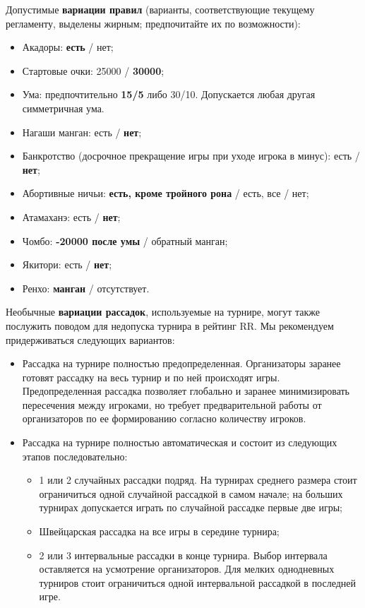 Допустимые \textbf{вариации правил} (варианты, соответствующие текущему регламенту, выделены жирным; предпочитайте их по возможности):
\begin{itemize}
	\item Акадоры: \textbf{есть} / нет;
	\item Стартовые очки: 25000 / \textbf{30000};
	\item Ума: предпочтительно \textbf{15/5} либо 30/10. Допускается любая другая симметричная ума.
	\item Нагаши манган: есть / \textbf{нет};
	\item Банкротство (досрочное прекращение игры при уходе игрока в минус): есть / \textbf{нет};
	\item Абортивные ничьи: \textbf{есть, кроме тройного рона} / есть, все / нет;
	\item Атамаханэ: есть / \textbf{нет};
	\item Чомбо: \textbf{-20000 после умы} / обратный манган;
	\item Якитори: есть / \textbf{нет};
	\item Ренхо: \textbf{манган} / отсутствует.
\end{itemize}

Необычные \textbf{вариации рассадок}, используемые на турнире, могут также послужить поводом для недопуска турнира в рейтинг RR. Мы рекомендуем придерживаться следующих вариантов:
\begin{itemize}
	\item Рассадка на турнире полностью предопределенная. Организаторы заранее готовят рассадку на весь турнир и по ней происходят игры. Предопределенная рассадка позволяет глобально и заранее минимизировать пересечения между игроками, но требует предварительной работы от организаторов по ее формированию согласно количеству игроков.
	\item Рассадка на турнире полностью автоматическая и состоит из следующих этапов последовательно:
	\begin{itemize}
		\item 1 или 2 случайных рассадки подряд. На турнирах среднего размера стоит ограничиться одной случайной рассадкой в самом начале; на больших турнирах допускается играть по случайной рассадке первые две игры;
		\item Швейцарская рассадка на все игры в середине турнира;
		\item 2 или 3 интервальные рассадки в конце турнира. Выбор интервала оставляется на усмотрение организаторов. Для мелких однодневных турниров стоит ограничиться одной интервальной рассадкой в последней игре.
	\end{itemize}
\end{itemize}

